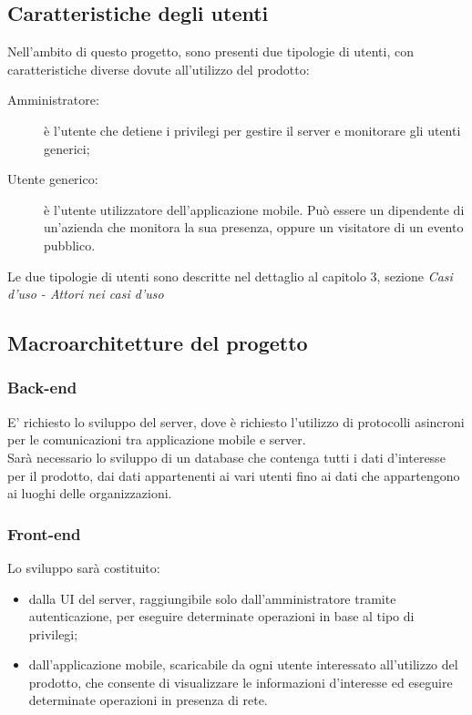 \documentclass[../analisi-dei-requisiti]{subfiles}
\begin{document}
\subsection{Caratteristiche degli utenti}%
\label{sub:caratteristiche_degli_utenti}
Nell'ambito di questo progetto, sono presenti due tipologie di utenti, con caratteristiche diverse dovute all'utilizzo del prodotto:
\begin{description}
  \item[Amministratore:] è l'utente che detiene i privilegi per gestire il server e monitorare gli utenti generici;
  \item[Utente generico:] è l'utente utilizzatore dell'applicazione mobile. Può essere un dipendente di un'azienda che monitora la sua presenza, oppure
  un visitatore di un evento pubblico.
\end{description}
Le due tipologie di utenti sono descritte nel dettaglio al capitolo 3, sezione \emph{Casi d'uso - Attori nei casi d'uso}

\subsection{Macroarchitetture del progetto}%
\label{sub:macroarchitetture_del_progetto}
\subsubsection{Back-end}%
\label{par:back-end}
E' richiesto lo sviluppo  del server, dove è richiesto l'utilizzo di protocolli asincroni per le comunicazioni tra applicazione mobile e server.\\
Sarà necessario lo sviluppo di un database che contenga tutti i dati d'interesse per il prodotto, dai dati appartenenti ai vari utenti fino ai dati che appartengono ai
luoghi delle organizzazioni.
\subsubsection{Front-end}%
\label{par:front-end}
Lo sviluppo  sarà costituito:
\begin{itemize}
  \item dalla UI del server, raggiungibile solo dall'amministratore tramite autenticazione, per eseguire determinate operazioni in base al tipo di privilegi;
  \item dall'applicazione mobile, scaricabile da ogni utente interessato all'utilizzo del prodotto, che consente di visualizzare le informazioni d'interesse ed eseguire determinate
  operazioni in presenza di rete.
\end{itemize}
\end{document}
